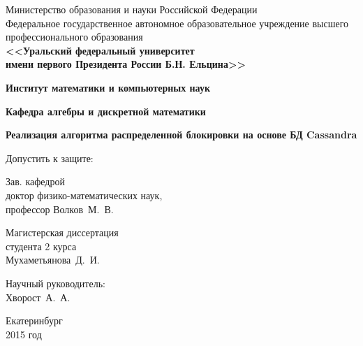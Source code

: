 \documentclass[12pt]{article}
\begin{document}
{\thispagestyle{empty}
\begin{center}
\scriptsize Министерство образования и науки Российской Федерации\\
\scriptsize Федеральное государственное автономное образовательное учреждение высшего профессионального образования\\
\small\bf <<Уральский федеральный университет\\
\small\bf имени первого Президента России Б.Н. Ельцина>>
\end{center}

\begin{center}
\normalsize\bf Институт математики и компьютерных наук\\
\end{center}
\begin{center}
\normalsize\bf Кафедра алгебры и дискретной математики\\
\end{center}

\vspace{3cm}

\begin{center}
\Large\bf Реализация алгоритма распределенной блокировки на основе БД Cassandra
\end{center}

\vspace{3.5cm}

\hspace{-1cm}
\begin{minipage}{80mm}
 \noindent
 \vspace{-2.3cm}
	\begin{flushleft}
		\normalsize Допустить к защите:\\
	\end{flushleft}
	
	\begin{flushleft}
		\normalsize Зав. кафедрой\\
		\normalsize доктор физико-математических наук,\\
		\normalsize профессор Волков~М.~В.
	\end{flushleft}
\end{minipage}
\begin{minipage}{85mm}
	\begin{flushright}
		\normalsize Магистерская диссертация\\
		\normalsize студента 2 курса\\
		\normalsize Мухаметьянова~Д.~И.
	\end{flushright}
	
	\vspace{0.5cm}
	
	\begin{flushright}
		\normalsize Научный руководитель:\\
		\normalsize Хворост~А.~А.
	\end{flushright}
\end{minipage}

\vspace{4cm}

\begin{center}
Екатеринбург\\
2015 год
\end{center}

}
\end{document}
